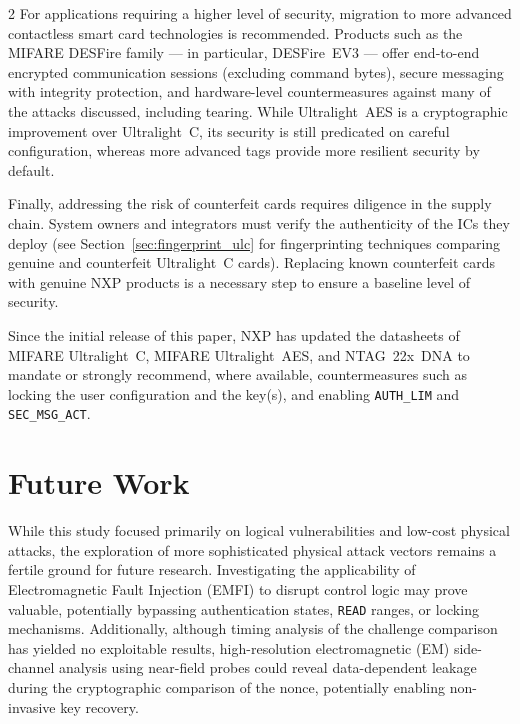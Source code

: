 \documentclass[10pt,letterpaper]{article}
\begin{document}
\begin{multicols}{2}
For applications requiring a higher level of security, migration to more advanced contactless smart card technologies is recommended. Products such as the MIFARE DESFire family --- in particular, DESFire~EV3 --- offer end-to-end encrypted communication sessions (excluding command bytes), secure messaging with integrity protection, and hardware-level countermeasures against many of the attacks discussed, including tearing. While Ultralight~AES is a cryptographic improvement over Ultralight~C, its security is still predicated on careful configuration, whereas more advanced tags provide more resilient security by default.

Finally, addressing the risk of counterfeit cards requires diligence in the supply chain. System owners and integrators must verify the authenticity of the ICs they deploy (see Section~\ref{sec:fingerprint_ulc} for fingerprinting techniques comparing genuine and counterfeit Ultralight~C cards). Replacing known counterfeit cards with genuine NXP products is a necessary step to ensure a baseline level of security.

Since the initial release of this paper, NXP has updated the datasheets of MIFARE Ultralight~C, MIFARE Ultralight~AES, and NTAG~22x~DNA to mandate or strongly recommend, where available, countermeasures such as locking the user configuration and the key(s), and enabling \texttt{AUTH\_LIM} and \texttt{SEC\_MSG\_ACT}.

\section{Future Work}
\label{sec:future}
While this study focused primarily on logical vulnerabilities and low-cost physical attacks, the exploration of more sophisticated physical attack vectors remains a fertile ground for future research. Investigating the applicability of Electromagnetic Fault Injection (EMFI) to disrupt control logic may prove valuable, potentially bypassing authentication states, \texttt{READ} ranges, or locking mechanisms. Additionally, although timing analysis of the challenge comparison has yielded no exploitable results, high-resolution electromagnetic (EM) side-channel analysis using near-field probes could reveal data-dependent leakage during the cryptographic comparison of the nonce, potentially enabling non-invasive key recovery.


\end{multicols}
\end{document}
